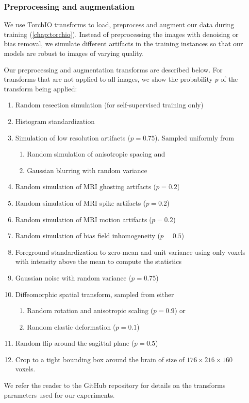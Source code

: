 \subsubsection{Preprocessing and augmentation}
\label{sec:preprocessing_augmentation}

We use TorchIO transforms to load, preprocess and augment our data during training \cite{perez-garcia_torchio_2021} (\cref{chap:torchio}).
Instead of preprocessing the images with denoising or bias removal, we simulate different artifacts in the training instances so that our models are robust to images of varying quality.

Our preprocessing and augmentation transforms are described below.
For transforms that are not applied to all images, we show the probability $p$ of the transform being applied:

\begin{enumerate}
    \item Random resection simulation (for self-supervised training only)
    \item Histogram standardization \cite{nyul_new_2000}
    \item Simulation of low resolution artifacts ($p = 0.75$). Sampled uniformly from
    \begin{enumerate}
        \item Random simulation of anisotropic spacing \cite{billot_partial_2020} and
        \item Gaussian blurring with random variance
    \end{enumerate}
    \item Random simulation of MRI ghosting artifacts \cite{shaw_heteroscedastic_2020} ($p = 0.2$)
    \item Random simulation of MRI spike artifacts \cite{shaw_heteroscedastic_2020} ($p = 0.2$)
    \item Random simulation of MRI motion artifacts \cite{shaw_mri_2019} ($p = 0.2$)
    \item Random simulation of bias field inhomogeneity \cite{sudre_longitudinal_2017} ($p = 0.5$)
    \item Foreground standardization to zero-mean and unit variance using only voxels with intensity above the mean to compute the statistics
    \item Gaussian noise with random variance ($p = 0.75$)
    \item Diffeomorphic spatial transform, sampled from either
    \begin{enumerate}
        \item Random rotation and anisotropic scaling ($p = 0.9$) or
        \item Random elastic deformation ($p = 0.1$)
    \end{enumerate}
    \item Random flip around the sagittal plane ($p = 0.5$)
    \item Crop to a tight bounding box around the brain of size of $176 \times 216 \times 160$ voxels.
\end{enumerate}

We refer the reader to the GitHub repository for details on the transforms parameters used for our experiments.
